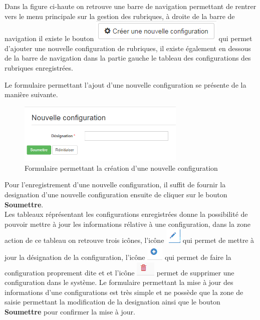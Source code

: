 \documentclass[12pt,a4paper]{report}
\begin{document}
Dans la figure ci-haute on retrouve une barre de navigation permettant de rentrer vers le menu principale sur la gestion des rubriques, à droite de la barre de navigation il existe le bouton \includegraphics[scale=1]{pic/CreatNCRub.png} qui permet d'ajouter une nouvelle configuration de rubriques, il existe également en dessous de la barre de navigation dans la partie gauche le tableau des configurations des rubriques enregistrées.

Le formulaire permettant l'ajout d'une nouvelle configuration se présente de la manière suivante. 

\begin{figure}[h]
\begin{center}
\includegraphics[width=8cm]{pic/NouvConfigR.png}
\end{center}
\caption{Formulaire permettant la création d'une nouvelle configuration}
\label{Formulaire permettant la création d'une nouvelle configuration}
\end{figure} 

\newpage
Pour l'enregistrement d'une nouvelle configuration, il suffit de fournir la designation d'une nouvelle configuration ensuite de cliquer sur le bouton \textbf{Soumettre}.
\\

Les tableaux réprésentant les configurations enregistrées donne la possibilité de pouvoir mettre à jour les informations rélative à une configuration, dans la zone action de ce tableau on retrouve trois icônes, l'icône \includegraphics[scale=0.7]{pic/EditUser.png} qui permet de mettre à jour la désignation de la configuration, l'icône  \includegraphics[scale=0.7]{pic/PlusConfigBlue.png} qui permet de faire la configuration proprement dite et  et l'icône  \includegraphics[scale=0.7]{pic/DeleteWRed.png} permet de supprimer une configuration dans le système.
Le formulaire permettant la mise à jour des informations d'une configurations est très simple et ne possède que la zone de saisie permettant la modification de la designation ainsi que le bouton \textbf{Soumettre} pour confirmer la mise à jour.
\end{document}
